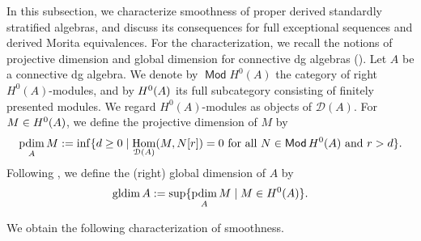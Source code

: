 \documentclass[a4paper,reqno,11pt]{amsart}
\numberwithin{equation}{section}
\theoremstyle{definition}
\newcommand{\D}{\mathcal{D}}
\DeclareMathOperator{\pd}{pdim}
\DeclareMathOperator{\gldim}{gldim}
\let\mod\relax
\DeclareMathOperator{\mod}{\mathsf{mod}}
\DeclareMathOperator{\Mod}{\mathsf{Mod}}
\DeclareMathOperator{\Hom}{Hom}
\begin{document}
In this subsection, we characterize smoothness of proper derived standardly stratified algebras, and discuss its consequences for full exceptional sequences and derived Morita equivalences.
For the characterization, we recall the notions of projective dimension and global dimension for connective dg algebras (\cite{Y13,M21}).
Let $A$ be a connective dg algebra.
We denote by $\Mod H^{0}(A)$ the category of right $H^{0}(A)$-modules, and by $\mod H^{0}(A)$ its full subcategory consisting of finitely presented modules.
We regard $H^{0}(A)$-modules as objects of $\D(A)$.
For $M\in\mod H^{0}(A)$, we define the projective dimension of $M$ by
\begin{align}
\pd_{A}M:=\inf\{d\geq 0\mid \Hom_{\D(A)}(M,N[r])=0 \text{ for all }N\in\Mod H^{0}(A)\text{ and }r>d\}.\notag
\end{align}
Following \cite[Definition 2.5]{H26}, we define the (right) global dimension of $A$ by
\begin{align}
\gldim A:=\sup\{\pd_{A}M\mid M\in\mod H^{0}(A)\}.\notag
\end{align}

We obtain the following characterization of smoothness.
\end{document}
